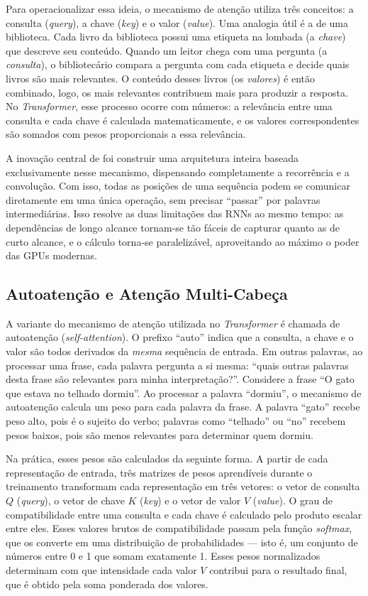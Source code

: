 Para operacionalizar essa ideia, o mecanismo de atenção utiliza três conceitos: a
consulta (\textit{query}), a chave (\textit{key}) e o valor (\textit{value}). Uma analogia
útil é a de uma biblioteca. Cada livro da biblioteca possui uma etiqueta na lombada
(a \textit{chave}) que descreve seu conteúdo. Quando um leitor chega com uma pergunta
(a \textit{consulta}), o bibliotecário compara a pergunta com cada etiqueta e decide
quais livros são mais relevantes. O conteúdo desses livros (os \textit{valores}) é então
combinado, logo, os mais relevantes contribuem mais para produzir a resposta. No
\textit{Transformer}, esse processo ocorre com números: a relevância entre uma consulta
e cada chave é calculada matematicamente, e os valores correspondentes são somados
com pesos proporcionais a essa relevância.

A inovação central de  foi construir uma arquitetura inteira
baseada exclusivamente nesse mecanismo, dispensando completamente a recorrência e a
convolução. Com isso, todas as posições de uma sequência podem se comunicar diretamente
em uma única operação, sem precisar ``passar'' por palavras intermediárias. Isso resolve
as duas limitações das RNNs ao mesmo tempo: as dependências de longo alcance tornam-se
tão fáceis de capturar quanto as de curto alcance, e o cálculo torna-se paralelizável,
aproveitando ao máximo o poder das GPUs modernas.

\subsection{Autoatenção e Atenção Multi-Cabeça}\label{subsec:autoatencao}

A variante do mecanismo de atenção utilizada no \textit{Transformer} é chamada de
autoatenção (\textit{self-attention}). O prefixo ``auto'' indica que a consulta, a chave
e o valor são todos derivados da \textit{mesma} sequência de entrada. Em outras palavras,
ao processar uma frase, cada palavra pergunta a si mesma: ``quais outras palavras desta
frase são relevantes para minha interpretação?''. Considere a frase ``O gato que estava
no telhado dormiu''. Ao processar a palavra ``dormiu'', o mecanismo de autoatenção
calcula um peso para cada palavra da frase. A palavra ``gato'' recebe peso alto, pois é
o sujeito do verbo; palavras como ``telhado'' ou ``no'' recebem pesos baixos, pois são
menos relevantes para determinar quem dormiu.

Na prática, esses pesos são calculados da seguinte forma. A partir de cada representação
de entrada, três matrizes de pesos aprendíveis durante o treinamento transformam cada
representação em três vetores: o vetor de consulta $Q$ (\textit{query}), o vetor de
chave $K$ (\textit{key}) e o vetor de valor $V$ (\textit{value}). O grau de compatibilidade
entre uma consulta e cada chave é calculado pelo produto escalar entre eles. Esses valores
brutos de compatibilidade passam pela função \textit{softmax}, que os converte em uma
distribuição de probabilidades --- isto é, um conjunto de números entre 0 e 1 que somam
exatamente 1. Esses pesos normalizados determinam com que intensidade cada valor $V$
contribui para o resultado final, que é obtido pela soma ponderada dos valores.

